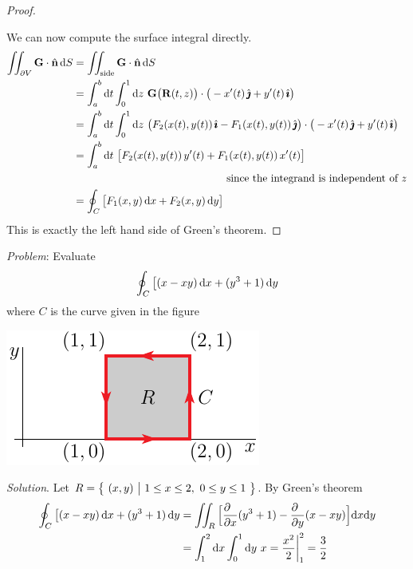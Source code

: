 \begin{proof}
\begin{nfig}
\begin{center}
\end{center}
\end{nfig}
We can now compute the surface integral directly.
\begin{align*}
\dblInt_{\partial V} \vG\cdot\hn\,\dee{S}
&=\dblInt_{\text{side}} \vG\cdot\hn\,\dee{S}  \\
&=\int_a^b\dee{t}\int_0^1\dee{z}\ \vG\big(\vR(t,z)\big)\cdot 
          \big(-x'(t)\,\hj +y'(t)\,\hi\big)
\\
&=\int_a^b\dee{t}\int_0^1\dee{z}\ 
         \big(F_2(x(t),y(t))\,\hi -F_1(x(t),y(t))\,\hj\big)\cdot 
          \big(-x'(t)\,\hj +y'(t)\,\hi\big) \\
&=\int_a^b\dee{t}\ 
         \big[F_2(x(t),y(t))\,y'(t) +F_1(x(t),y(t))\,x'(t)\big]
\\
&\hskip2in \text{since the integrand is independent of $z$}
\\
&=\oint_{C} \big[F_1(x,y)\,\dee{x} +F_2(x,y)\,\dee{y}\big]
\end{align*}
This is exactly the left 
hand side of Green's theorem.
\end{proof}


\begin{eg}\label{eg:greenA}
\noindent\textit{Problem}:
Evaluate
\begin{equation*}
\oint_C\big[(x-xy)\,\mathrm{d}x + (y^3+1)\,\mathrm{d}y
\end{equation*}
where $C$ is the curve given in the figure
\begin{nfig}
\begin{center}
   \includegraphics{greensSquare.pdf}
\end{center}
\end{nfig}
\medskip
\noindent\textit{Solution}. Let $R=\big\{ \ (x,y)\ \big|\ 1\le x\le 2,\ 0\le y\le 1\ \big\}$.
By Green's theorem
\begin{align*}
\oint_C\big[(x-xy)\,\dee{x} + (y^3+1)\,\dee{y}
&=\dblInt_R\Big[\frac{\partial\hfill}{\partial x}(y^3+1) 
                - \frac{\partial\hfill}{\partial y}(x-xy)\Big]\dee{x}\dee{y}\\
&=\int_1^2\dee{x}\int_0^1\dee{y}\ x
=\frac{x^2}{2}\bigg|_1^2
=\frac{3}{2}
\end{align*}
\end{eg}

